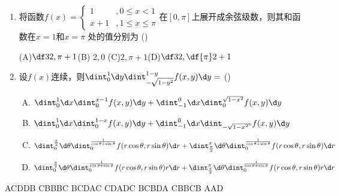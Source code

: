 \begin{enumerate}
  (A)$\df34$\hspace{1cm}(B)$\df12$\hspace{1cm}
  (C)$-\df34$\hspace{1cm}(D)$-\df12$
  \item 将函数$f(x)=\left\{\begin{array}{ll}
  1&,0\leq x<1\\ x+1&,1\leq x\leq \pi
  \end{array}\right.$在$[0,\pi]$上展开成余弦级数，则其和函数在$x=1$和$x=\pi$
  处的值分别为
  (\underline{\hspace{1cm}})
  
  (A)$\df32,\pi+1$\hspace{1cm}(B) $2,0$\hspace{1cm}
  (C)$2,\pi+1$\hspace{1cm}(D)$\df32,\df{\pi}2+1$
  \item 设$f(x)$连续，则$\dint_0^1\d y\dint_{-\sqrt{1-y^2}}^{1-y}f(x,y)\d y=$
  (\underline{\hspace{1cm}})
  \begin{enumerate}[(A)]
    \item $\dint_0^1\d x\dint_{0}^{x-1}f(x,y)\d y
    +\dint_{-1}^0\d x\dint_0^{\sqrt{1-x^2}}f(x,y)\d y$
    \item $\dint_0^1\d x\dint_{0}^{1-x}f(x,y)\d y
    +\dint_{-1}^0\d x\dint_{-\sqrt{1-x^2}^0}f(x,y)\d y$
    \item $\dint_0^{\frac{\pi}2}\d\theta\dint_0^{\frac1{\cos\theta+\sin\theta}}
    f(r\cos\theta,r\sin\theta)\d r+\dint_{\frac{\pi}2}^{\pi}\d\theta
    \dint_0^{\frac1{\cos\theta+\sin\theta}}f(r\cos\theta,r\sin\theta)\d r$
    \item $\dint_0^{\frac{\pi}2}\d\theta\dint_0^{\frac1{\cos\theta+\sin\theta}}
    f(r\cos\theta,r\sin\theta)r\d r+\dint_{\frac{\pi}2}^{\pi}\d\theta
    \dint_0^{\frac1{\cos\theta+\sin\theta}}f(r\cos\theta,r\sin\theta)r\d r$
  \end{enumerate}
  
\end{enumerate}

ACDDB CBBBC BCDAC CDADC BCBDA CBBCB AAD